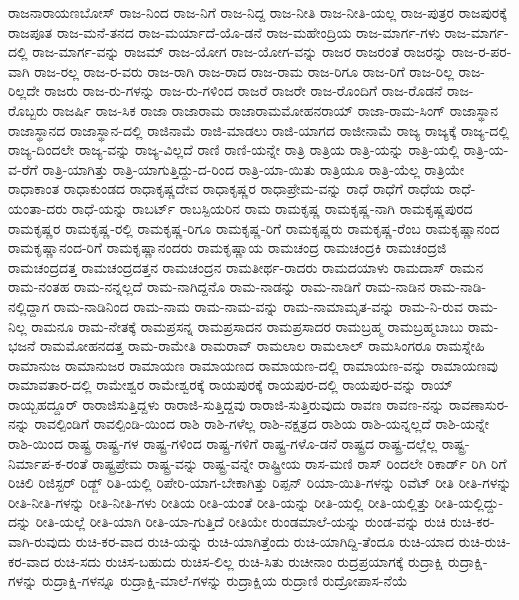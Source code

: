 {ರಾಜನಾರಾಯಣಬೋಸ್
ರಾಜ-ನಿಂದ
ರಾಜ-ನಿಗೆ
ರಾಜ-ನಿದ್ದ
ರಾಜ-ನೀತಿ
ರಾಜ-ನೀತಿ-ಯಲ್ಲ
ರಾಜ-ಪುತ್ರರ
ರಾಜಪುರಕ್ಕೆ
ರಾಜಪೂತ
ರಾಜ-ಮನೆ-ತನದ
ರಾಜ-ಮರ್ಯಾದೆ-ಯೊ-ಡನೆ
ರಾಜ-ಮಹೇಂದ್ರಿಯ
ರಾಜ-ಮಾರ್ಗ-ಗಳು
ರಾಜ-ಮಾರ್ಗ-ದಲ್ಲಿ
ರಾಜ-ಮಾರ್ಗ-ವನ್ನು
ರಾಜಮ್
ರಾಜ-ಯೋಗ
ರಾಜ-ಯೋಗ-ವನ್ನು
ರಾಜರ
ರಾಜರಂತೆ
ರಾಜರನ್ನು
ರಾಜ-ರ-ಪರ-ವಾಗಿ
ರಾಜ-ರಲ್ಲ
ರಾಜ-ರ-ವರು
ರಾಜ-ರಾಗಿ
ರಾಜ-ರಾದ
ರಾಜ-ರಾಮ
ರಾಜ-ರಿಗೂ
ರಾಜ-ರಿಗೆ
ರಾಜ-ರಿಲ್ಲ
ರಾಜ-ರಿಲ್ಲದೇ
ರಾಜರು
ರಾಜ-ರು-ಗಳನ್ನು
ರಾಜ-ರು-ಗಳಿಂದ
ರಾಜರೆ
ರಾಜರೇ
ರಾಜ-ರೊಂದಿಗೆ
ರಾಜ-ರೊಡನೆ
ರಾಜ-ರೊಬ್ಬರು
ರಾಜರ್ಷಿ
ರಾಜ-ಸಿಕ
ರಾಜಾ
ರಾಜಾರಾಮ
ರಾಜಾರಾಮಮೋಹನರಾಯ್
ರಾಜಾ-ರಾಮ-ಸಿಂಗ್
ರಾಜಾಸ್ಥಾನ
ರಾಜಾಸ್ಥಾನದ
ರಾಜಾಸ್ಥಾನ-ದಲ್ಲಿ
ರಾಜಿನಾಮೆ
ರಾಜಿ-ಮಾಡಲು
ರಾಜಿ-ಯಾಗದ
ರಾಜೀನಾಮೆ
ರಾಜ್ಯ
ರಾಜ್ಯಕ್ಕೆ
ರಾಜ್ಯ-ದಲ್ಲಿ
ರಾಜ್ಯ-ದಿಂದಲೇ
ರಾಜ್ಯ-ವನ್ನು
ರಾಜ್ಯ-ವಿಲ್ಲದೆ
ರಾಣಿ
ರಾಣಿ-ಯನ್ನೇ
ರಾತ್ರಿ
ರಾತ್ರಿಯ
ರಾತ್ರಿ-ಯನ್ನು
ರಾತ್ರಿ-ಯಲ್ಲಿ
ರಾತ್ರಿ-ಯ-ವ-ರೆಗೆ
ರಾತ್ರಿ-ಯಾಗಿತ್ತು
ರಾತ್ರಿ-ಯಾಗುತ್ತಿದ್ದು-ದ-ರಿಂದ
ರಾತ್ರಿ-ಯಾ-ಯಿತು
ರಾತ್ರಿಯೂ
ರಾತ್ರಿ-ಯೆಲ್ಲ
ರಾತ್ರಿಯೇ
ರಾಧಾಕಾಂತ
ರಾಧಾಕುಂಡದ
ರಾಧಾಕೃಷ್ಣದೇವ
ರಾಧಾಕೃಷ್ಣರ
ರಾಧಾಪ್ರೇಮ-ವನ್ನು
ರಾಧೆ
ರಾಧೆಗೆ
ರಾಧೆಯ
ರಾಧೆ-ಯಂತಾ-ದರು
ರಾಧೆ-ಯನ್ನು
ರಾಬರ್ಟ್
ರಾಬಸ್ಪಿಯರಿನ
ರಾಮ
ರಾಮಕೃಷ್ಣ
ರಾಮಕೃಷ್ಣ-ನಾಗಿ
ರಾಮಕೃಷ್ಣಪುರದ
ರಾಮಕೃಷ್ಣರ
ರಾಮಕೃಷ್ಣ-ರಲ್ಲಿ
ರಾಮಕೃಷ್ಣ-ರಿಗೂ
ರಾಮಕೃಷ್ಣ-ರಿಗೆ
ರಾಮಕೃಷ್ಣರು
ರಾಮಕೃಷ್ಣ-ರೆಂಬ
ರಾಮಕೃಷ್ಣಾನಂದ
ರಾಮಕೃಷ್ಣಾನಂದ-ರಿಗೆ
ರಾಮಕೃಷ್ಣಾನಂದರು
ರಾಮಕೃಷ್ಣಾಯ
ರಾಮಚಂದ್ರ
ರಾಮಚಂದ್ರಕಿ
ರಾಮಚಂದ್ರಜಿ
ರಾಮಚಂದ್ರದತ್ತ
ರಾಮಚಂದ್ರದತ್ತನ
ರಾಮಚಂದ್ರನ
ರಾಮತೀರ್ಥ-ರಾದರು
ರಾಮದಯಾಳು
ರಾಮದಾಸ್
ರಾಮನ
ರಾಮ-ನಂತಹ
ರಾಮ-ನನ್ನಲ್ಲದೆ
ರಾಮ-ನಾಗಿದ್ದನೊ
ರಾಮ-ನಾಡನ್ನು
ರಾಮ-ನಾಡಿಗೆ
ರಾಮ-ನಾಡಿನ
ರಾಮ-ನಾಡಿ-ನಲ್ಲಿದ್ದಾಗ
ರಾಮ-ನಾಡಿನಿಂದ
ರಾಮ-ನಾಮ
ರಾಮ-ನಾಮ-ವನ್ನು
ರಾಮ-ನಾಮಾಮೃತ-ವನ್ನು
ರಾಮ-ನಿ-ರುವ
ರಾಮ-ನಿಲ್ಲ
ರಾಮನೂ
ರಾಮ-ನೇತಕ್ಕೆ
ರಾಮಪ್ರಸನ್ನ
ರಾಮಪ್ರಸಾದನ
ರಾಮಪ್ರಸಾದರ
ರಾಮಬ್ರಹ್ಮ
ರಾಮಬ್ರಹ್ಮಬಾಬು
ರಾಮ-ಭಜನೆ
ರಾಮಮೋಹನದತ್ತ
ರಾಮ-ರಾಮೇತಿ
ರಾಮರಾವ್
ರಾಮಲಾಲ
ರಾಮಲಾಲ್
ರಾಮಸಿಂಗರೂ
ರಾಮಸ್ನೇಹಿ
ರಾಮಾನುಜ
ರಾಮಾನುಜರ
ರಾಮಾಯಣ
ರಾಮಾಯಣದ
ರಾಮಾಯಣ-ದಲ್ಲಿ
ರಾಮಾಯಣ-ವನ್ನು
ರಾಮಾಯಣವು
ರಾಮಾವತಾರ-ದಲ್ಲಿ
ರಾಮೇಶ್ವರ
ರಾಮೇಶ್ವರಕ್ಕೆ
ರಾಯಪುರಕ್ಕೆ
ರಾಯಪುರ-ದಲ್ಲಿ
ರಾಯಪುರ-ವನ್ನು
ರಾಯ್
ರಾಯ್ಬಹದ್ದೂರ್
ರಾರಾಜಿಸುತ್ತಿದ್ದಳು
ರಾರಾಜಿ-ಸುತ್ತಿದ್ದವು
ರಾರಾಜಿ-ಸುತ್ತಿರುವುದು
ರಾವಣ
ರಾವಣ-ನನ್ನು
ರಾವಣಾಸುರ-ನನ್ನು
ರಾವಲ್ಪಿಂಡಿಗೆ
ರಾವಲ್ಪಿಂಡಿ-ಯಿಂದ
ರಾಶಿ
ರಾಶಿ-ಗಳೆಲ್ಲ
ರಾಶಿ-ನಕ್ಷತ್ರದ
ರಾಶಿಯ
ರಾಶಿ-ಯನ್ನಲ್ಲದೆ
ರಾಶಿ-ಯನ್ನೇ
ರಾಶಿ-ಯಿಂದ
ರಾಷ್ಟ್ರ
ರಾಷ್ಟ್ರ-ಗಳ
ರಾಷ್ಟ್ರ-ಗಳಿಂದ
ರಾಷ್ಟ್ರ-ಗಳಿಗೆ
ರಾಷ್ಟ್ರ-ಗಳೊ-ಡನೆ
ರಾಷ್ಟ್ರದ
ರಾಷ್ಟ್ರ-ದಲ್ಲೆಲ್ಲ
ರಾಷ್ಟ್ರ-ನಿರ್ಮಾಪ-ಕ-ರಂತೆ
ರಾಷ್ಟ್ರಪ್ರೇಮ
ರಾಷ್ಟ್ರ-ವನ್ನು
ರಾಷ್ಟ್ರ-ವನ್ನೇ
ರಾಷ್ಟ್ರೀಯ
ರಾಸ-ಮಣಿ
ರಾಸ್
ರಿಂದಲೇ
ರಿಕಾರ್ಡ್
ರಿಗಿ
ರಿಗೆ
ರಿಚಿಲಿ
ರಿಜಿಸ್ಟರ್
ರಿಡ್ಜ್
ರಿತಿ-ಯಲ್ಲಿ
ರಿಪೇರಿ-ಯಾಗ-ಬೇಕಾಗಿತ್ತು
ರಿಪ್ಪನ್
ರಿಯಾ-ಯಿತಿ-ಗಳನ್ನು
ರಿವೆಟ್
ರೀತಿ
ರೀತಿ-ಗಳನ್ನು
ರೀತಿ-ನೀತಿ-ಗಳನ್ನು
ರೀತಿ-ನೀತಿ-ಗಳು
ರೀತಿಯ
ರೀತಿ-ಯಂತೆ
ರೀತಿ-ಯನ್ನು
ರೀತಿ-ಯಲ್ಲಿ
ರೀತಿ-ಯಲ್ಲಿತ್ತು
ರೀತಿ-ಯಲ್ಲಿದ್ದು-ದನ್ನು
ರೀತಿ-ಯಲ್ಲೆ
ರೀತಿ-ಯಾಗಿ
ರೀತಿ-ಯಾ-ಗುತ್ತಿದೆ
ರೀತಿಯೇ
ರುಂಡಮಾಲೆ-ಯನ್ನು
ರುಂಡ-ವನ್ನು
ರುಚಿ
ರುಚಿ-ಕರ-ವಾಗಿ-ರುವುದು
ರುಚಿ-ಕರ-ವಾದ
ರುಚಿ-ಯನ್ನು
ರುಚಿ-ಯಾಗಿತ್ತೆಂದು
ರುಚಿ-ಯಾಗಿದ್ದಿ-ತೆಂದೂ
ರುಚಿ-ಯಾದ
ರುಚಿ-ರುಚಿ-ಕರ-ವಾದ
ರುಚಿ-ಸದು
ರುಚಿಸ-ಬಹುದು
ರುಚಿಸ-ಲಿಲ್ಲ
ರುಚಿ-ಸಿತು
ರುಚೀನಾಂ
ರುದ್ರಪ್ರಯಾಗಕ್ಕೆ
ರುದ್ರಾಕ್ಷಿ
ರುದ್ರಾಕ್ಷಿ-ಗಳನ್ನು
ರುದ್ರಾಕ್ಷಿ-ಗಳನ್ನೂ
ರುದ್ರಾಕ್ಷಿ-ಮಾಲೆ-ಗಳನ್ನು
ರುದ್ರಾಕ್ಷಿಯ
ರುದ್ರಾಣಿ
ರುದ್ರೋಪಾಸ-ನೆಯೆ
}
